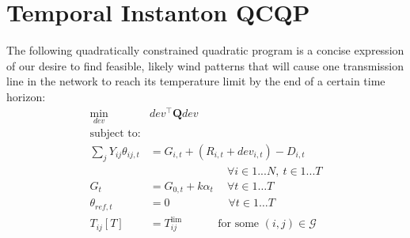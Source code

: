 \documentclass[journal,twoside]{IEEEtran}
\begin{document}
\section{Temporal Instanton QCQP}\label{sec:qcqp}
The following quadratically constrained quadratic program is a concise expression of our desire to find feasible, likely wind patterns that will cause one transmission line in the network to reach its temperature limit by the end of a certain time horizon:
\begin{subequations}\label{eq:qcqp}
\begin{align}
\label{eq:qcqp-obj}\underset{dev}{\min} \quad & dev^\top \mathbf{Q} dev \\
\nonumber \text{subject to:} & \\
\label{eq:qcqp-flow} \sum_j Y_{ij} \theta_{ij,t} & = G_{i,t} + (R_{i,t} +
dev_{i,t}) - D_{i,t} \\[-8pt]
\nonumber &\qquad\qquad\qquad\quad \forall i \in 1... N,~t\in 1... T \\%
\label{eq:qcqp-conv} G_t &= G_{0,t} + k\alpha_t \quad\: \forall t\in 1\ldots T \\
\label{eq:qcqp-ref} \theta_{ref,t} & = 0 \qquad\qquad\quad\; \forall t\in 1\ldots T \\
\label{eq:qcqp-temp} T_{ij}[T] &= T_{ij}^\text{lim}\qquad\quad\: \text{for some }(i,j)\in \mathcal{G}
\end{align}
\end{subequations}
%
%
%
%
%
%
\end{document}
